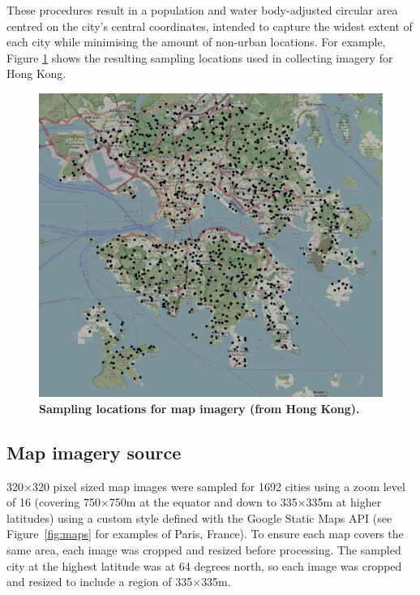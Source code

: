 \documentclass[9pt,twocolumn,twoside,lineno]{pnas-new}
\begin{document}
{These procedures result in a population and water body-adjusted circular area centred on the city's central coordinates, intended to capture the widest extent of each city while minimising the amount of non-urban locations. For example, Figure \ref{fig:parissample} shows the resulting sampling locations used in collecting imagery for Hong Kong. 

\begin{figure}
\centering
\includegraphics[trim={0 0 0 0},clip,scale=0.10]{HongKongSamples_.png}
\caption{\bf Sampling locations for map imagery (from Hong Kong).}
 \label{fig:parissample}
\end{figure} 



\subsection*{Map imagery source}\label{methodsimagery}

320$\times$320 pixel sized map images were sampled for 1692 cities using a zoom level of 16 (covering 750$\times$750m at the equator and down to 335$\times$335m at higher latitudes) using a custom style defined with the Google Static Maps API\cite{GoogleStatic2017} (see Figure~\ref{fig:maps} for examples of Paris, France). To ensure each map covers the same area, each image was cropped and resized before processing. The sampled city at the highest latitude was at 64 degrees north, so each image was cropped and resized to include a region of 335$\times$335m. 

}
\end{document}

